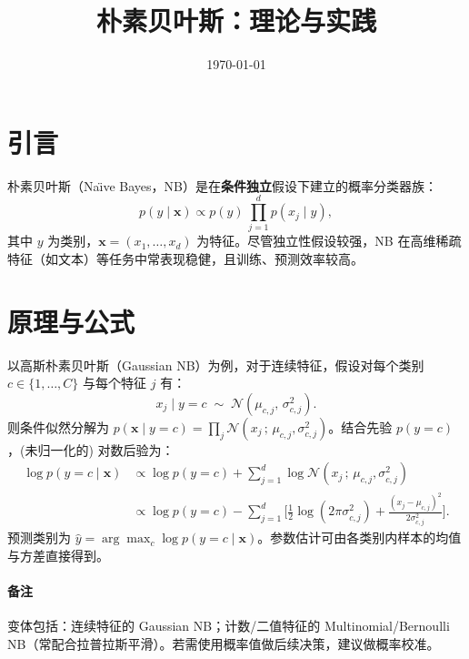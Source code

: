 \documentclass[UTF8,zihao=-4]{ctexart}
\title{朴素贝叶斯：理论与实践}
\author{}
\date{\today}
\begin{document}
\maketitle


\section{引言}
朴素贝叶斯（Na\"\i ve Bayes，NB）是在\textbf{条件独立}假设下建立的概率分类器族：
\begin{equation}
 p(y\mid \mathbf{x}) \propto p(y)\,\prod_{j=1}^{d} p(x_j \mid y),
\end{equation}
其中 $y$ 为类别，$\mathbf{x}=(x_1,\dots,x_d)$ 为特征。尽管独立性假设较强，NB 在高维稀疏特征（如文本）等任务中常表现稳健，且训练、预测效率较高。

\section{原理与公式}
以高斯朴素贝叶斯（Gaussian NB）为例，对于连续特征，假设对每个类别 $c\in\{1,\dots,C\}$ 与每个特征 $j$ 有：
\begin{equation}
 x_j \mid y=c \;\sim\; \mathcal{N}(\mu_{c,j},\, \sigma^2_{c,j}).
\end{equation}
则条件似然分解为 $p(\mathbf{x}\mid y=c)=\prod_{j} \mathcal{N}(x_j\,;\,\mu_{c,j},\sigma^2_{c,j})$。结合先验 $p(y=c)$，(未归一化的) 对数后验为：
\begin{align}
 \log p(y=c\mid \mathbf{x}) 
 &\propto \log p(y=c) + \sum_{j=1}^d \log \mathcal{N}(x_j\,;\,\mu_{c,j},\sigma^2_{c,j})\\
 &\propto \log p(y=c) - \sum_{j=1}^d \Big[ \tfrac{1}{2}\log (2\pi\sigma^2_{c,j}) + \tfrac{(x_j-\mu_{c,j})^2}{2\sigma^2_{c,j}} \Big].
\end{align}
预测类别为 $\hat y = \arg\max_c \log p(y=c\mid \mathbf{x})$。参数估计可由各类别内样本的均值与方差直接得到。

\paragraph{备注} 变体包括：连续特征的 Gaussian NB；计数/二值特征的 Multinomial/Bernoulli NB（常配合拉普拉斯平滑）。若需使用概率值做后续决策，建议做概率校准。
\end{document}
